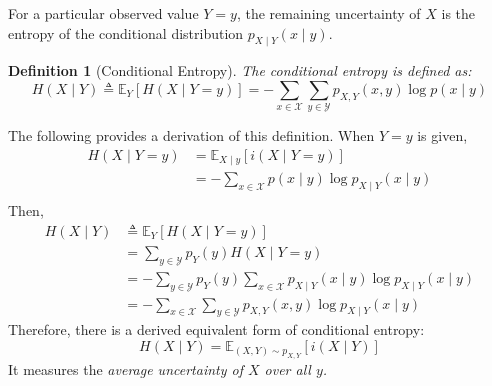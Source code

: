 \documentclass[11pt]{report}
\theoremstyle{lecturedefinition}
\newtheorem{definition}{Definition}
\theoremstyle{lectureremark}
\begin{document}
For a particular observed value $Y=y$, the remaining uncertainty of $X$ is the entropy of the conditional distribution $p_{X\mid Y}(x\mid y)$.
\begin{definition}[Conditional Entropy]
The conditional entropy is defined as:
\begin{equation*}
    H(X\mid Y)\triangleq \mathbb{E}_{Y}[H(X\mid Y=y)]=-\sum_{x\in \mathcal{X}}\sum_{y\in \mathcal{Y}}p_{X,Y}(x,y)\log p(x\mid y)
\end{equation*}
\end{definition}
The following provides a derivation of this definition. When $Y=y$ is given,
\begin{equation*}
    \begin{aligned}
        H(X\mid Y=y)&=\mathbb{E}_{X\mid y}\left[i(X\mid Y=y)\right]\\
        &=-\sum_{x\in\mathcal{X}}p(x\mid y)\log p_{X\mid Y}(x\mid y)\\
    \end{aligned}
\end{equation*}
Then,
\begin{equation*}
    \begin{aligned}
        H(X\mid Y)&\triangleq\mathbb{E}_{Y}[H(X\mid Y=y)]\\
        &=\sum_{y\in \mathcal{Y}}p_Y(y)H(X\mid Y=y)\\
        &=-\sum_{y\in\mathcal{Y}}p_Y(y)\sum_{x\in\mathcal{X}}p_{X\mid Y}(x\mid y)\log p_{X\mid Y}(x\mid y)\\
        &=-\sum_{x\in\mathcal{X}}\sum_{y\in\mathcal{Y}}p_{X,Y}(x,y)\log p_{X\mid Y}(x\mid y)
    \end{aligned}
\end{equation*}
Therefore, there is a derived equivalent form of conditional entropy:
\begin{equation}
    H(X\mid Y)=\mathbb{E}_{(X,Y)\sim p_{X,Y}}\left[i(X\mid Y)\right]
\end{equation}
It measures the \textit{average uncertainty of $X$ over all $y$.}
\end{document}
